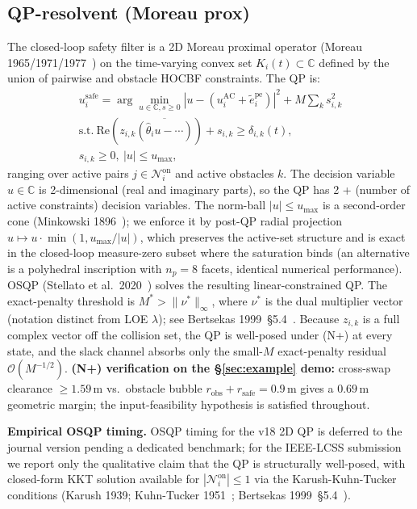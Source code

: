 \documentclass[letterpaper,10pt,conference]{IEEEtran}
\newcommand{\rsafe}{r_{\text{safe}}}
\newcommand{\thethat}{\hat\theta}
\renewcommand{\Re}{\mathrm{Re}}
\begin{document}
\subsection{QP-resolvent (Moreau prox)}\label{sec:qp}
The closed-loop safety filter is a 2D Moreau proximal operator (Moreau 1965/1971/1977~\cite{moreau1965,moreau1971,moreau1977}) on the time-varying convex set $K_i(t) \subset \mathbb{C}$ defined by the union of pairwise and obstacle HOCBF constraints. The QP is:
\begin{multline}
u_i^{\text{safe}} = \arg\min_{u\in\mathbb{C}, s\ge 0} |u - (u_i^{\text{AC}} + \tilde e_i^{\text{pe}})|^2 + M\!\!\sum_{k}\!\!s_{i,k}^2\\
\text{s.t.}\ \Re(z_{i,k}\overline{(\thethat_i u - \cdots)}) + s_{i,k} \ge \delta_{i,k}(t),\\ s_{i,k} \ge 0,\ |u| \le u_{\max},
\end{multline}
ranging over active pairs $j \in \mathcal{N}_i^{\text{on}}$ and active obstacles $k$. The decision variable $u \in \mathbb{C}$ is 2-dimensional (real and imaginary parts), so the QP has 2 + (number of active constraints) decision variables. The norm-ball $|u| \le u_{\max}$ is a second-order cone (Minkowski 1896~\cite{minkowski1896}); we enforce it by post-QP radial projection $u \mapsto u\cdot\min(1, u_{\max}/|u|)$, which preserves the active-set structure and is exact in the closed-loop measure-zero subset where the saturation binds (an alternative is a polyhedral inscription with $n_p = 8$ facets, identical numerical performance). OSQP (Stellato et al.\ 2020~\cite{stellatoEtAl2020}) solves the resulting linear-constrained QP. The exact-penalty threshold is $M^* > \|\nu^*\|_\infty$, where $\nu^*$ is the dual multiplier vector (notation distinct from LOE $\lambda$); see Bertsekas 1999~\S5.4~\cite{bertsekas1999}. Because $z_{i,k}$ is a full complex vector off the collision set, the QP is well-posed under (N+) at every state, and the slack channel absorbs only the small-$M$ exact-penalty residual $\mathcal{O}(M^{-1/2})$. \textbf{(N+) verification on the §\ref{sec:example} demo:} cross-swap clearance $\geq 1.59$\,m vs.\ obstacle bubble $r_{\text{obs}} + \rsafe = 0.9$\,m gives a $0.69$\,m geometric margin; the input-feasibility hypothesis is satisfied throughout.

\textbf{Empirical OSQP timing.} OSQP timing for the v18 2D QP is deferred to the journal version pending a dedicated benchmark; for the IEEE-LCSS submission we report only the qualitative claim that the QP is structurally well-posed, with closed-form KKT solution available for $|\mathcal{N}_i^{\text{on}}| \le 1$ via the Karush-Kuhn-Tucker conditions (Karush 1939; Kuhn-Tucker 1951~\cite{kuhnTucker1951}; Bertsekas 1999~\S5.4~\cite{bertsekas1999}).
\end{document}
